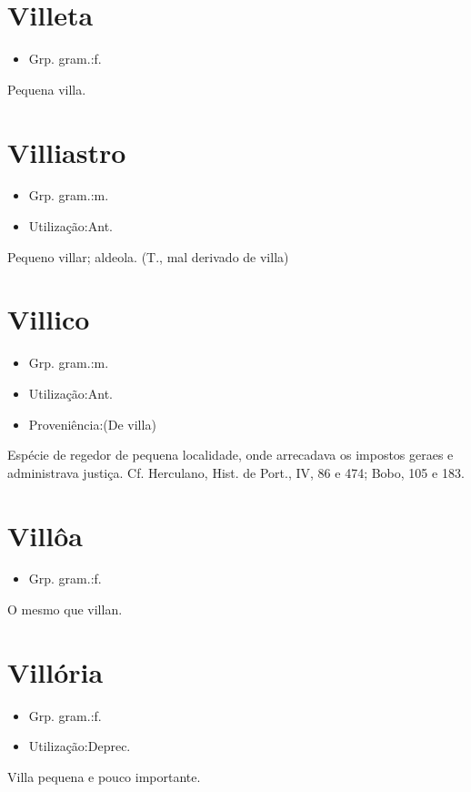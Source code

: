 \documentclass{article}
\begin{document}
\section{Villeta}
\begin{itemize}
\item {Grp. gram.:f.}
\end{itemize}
Pequena villa.
\section{Villiastro}
\begin{itemize}
\item {Grp. gram.:m.}
\end{itemize}
\begin{itemize}
\item {Utilização:Ant.}
\end{itemize}
Pequeno villar; aldeola.
(T., mal derivado de \textunderscore villa\textunderscore )
\section{Villico}
\begin{itemize}
\item {Grp. gram.:m.}
\end{itemize}
\begin{itemize}
\item {Utilização:Ant.}
\end{itemize}
\begin{itemize}
\item {Proveniência:(De \textunderscore villa\textunderscore )}
\end{itemize}
Espécie de regedor de pequena localidade, onde arrecadava os impostos geraes e administrava justiça. Cf. Herculano, \textunderscore Hist. de Port.\textunderscore , IV, 86 e 474; \textunderscore Bobo\textunderscore , 105 e 183.
\section{Villôa}
\begin{itemize}
\item {Grp. gram.:f.}
\end{itemize}
O mesmo que \textunderscore villan\textunderscore .
\section{Villória}
\begin{itemize}
\item {Grp. gram.:f.}
\end{itemize}
\begin{itemize}
\item {Utilização:Deprec.}
\end{itemize}
Villa pequena e pouco importante.
\end{document}
